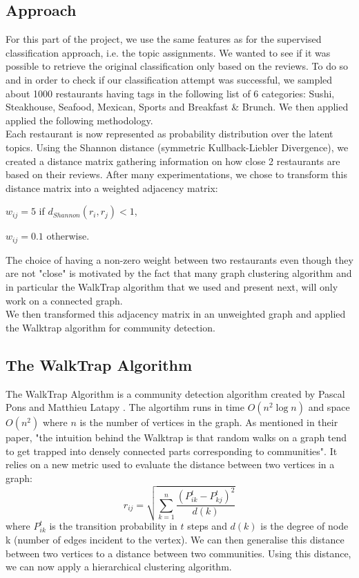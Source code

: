 \documentclass[twoside]{article}
\begin{document}
\begin{multicols}{2}
\subsection{Approach}

For this part of the project, we use the same features as for the supervised classification approach, i.e. the topic assignments. We wanted to see if it was possible to retrieve the original classification only based on the reviews. To do so and in order to check if our classification attempt was successful, we sampled about 1000 restaurants having tags in the following list of 6 categories: Sushi, Steakhouse, Seafood, Mexican, Sports and Breakfast \& Brunch. We then applied applied the following methodology.\\

Each restaurant is now represented as probability distribution over the latent topics. Using the Shannon distance (symmetric Kullback-Liebler Divergence), we created a distance matrix gathering information on how close 2 restaurants are based on their reviews. After many experimentations, we chose to transform this distance matrix into a weighted adjacency matrix:\\

\begin{compactitem}
\item $w_{ij} = 5$ if $d_{Shannon}(r_i,r_j)<1$,
\item $w_{ij} = 0.1$ otherwise.\\
\end{compactitem}

\noindent The choice of having a non-zero weight between two restaurants even though they are not "close" is motivated by the fact that many graph clustering algorithm and in particular the WalkTrap algorithm that we used and present next, will only work on a connected graph.\\

\noindent We then transformed this adjacency matrix in an unweighted graph and applied the Walktrap algorithm for community detection.\\

\subsection{The WalkTrap Algorithm}
The WalkTrap Algorithm is a community detection algorithm created by Pascal Pons and Matthieu Latapy \cite{Gr}. The algortihm runs in time $O(n^2\log n)$ and space $O(n^2)$ where $n$ is the number of vertices in the graph. As mentioned in their paper, "the intuition behind the Walktrap is that random walks on a graph tend to get trapped into densely connected parts corresponding to communities".\cite{Gr} It relies on a new metric used to evaluate the distance between two vertices in a graph:
 $$r_{ij} = \sqrt{\sum\limits_{k=1}^{n}\frac{(P^t_{ik}-P^t_{kj})^2}{d(k)}}$$
 where $P^t_{ik}$ is the transition probability in $t$ steps and $d(k)$ is the degree of node k (number of edges incident to the vertex). We can then generalise this distance between two vertices to a distance between two communities. Using this distance, we can now apply a hierarchical clustering algorithm.


\end{multicols}
\end{document}
